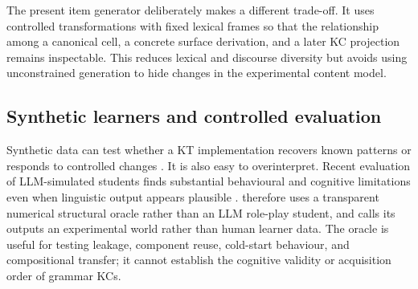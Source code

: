 The present item generator deliberately makes a different trade-off.  It uses
controlled transformations with fixed lexical frames so that the relationship
among a canonical cell, a concrete surface derivation, and a later KC
projection remains inspectable.  This reduces lexical and discourse diversity
but avoids using unconstrained generation to hide changes in the experimental
content model.

\subsection{Synthetic learners and controlled evaluation}

Synthetic data can test whether a KT implementation recovers known patterns or
responds to controlled changes \citep{pagonis-etal-2024}.  It is also easy to
overinterpret.  Recent evaluation of LLM-simulated students finds substantial
behavioural and cognitive limitations even when linguistic output appears
plausible \citep{scarlatos-etal-2026-simulated}.  \system therefore uses a
transparent numerical structural oracle rather than an LLM role-play student,
and calls its outputs an experimental world rather than human learner data.
The oracle is useful for testing leakage, component reuse, cold-start behaviour,
and compositional transfer; it cannot establish the cognitive validity or
acquisition order of grammar KCs.
